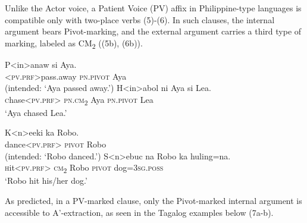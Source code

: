 \documentclass[10pt]{article}
\makeatletter
\newcommand{\boxit}{\@ifstar\@boxit\@@boxit}
\newcommand{\@@boxit}{\@boxit{1}}
\newcommand\@boxit[1]{%
\tikz[overlay,remember picture]{
\def\pointlist{}
\pgfmathsetmacro{\endpoint}{#1+1}
\foreach \x in {#1,...,\endpoint}
{\xdef\pointlist{\pointlist(\x)}}%
\node[draw,rectangle,yshift=2.6pt,semithick,
      fit=\pointlist,
      inner sep=-2.8pt,text depth=1\baselineskip] {};
}}
\makeatother
\begin{document}
Unlike the Actor voice, a Patient Voice (PV) affix in Philippine-type languages is compatible only with two-place verbs (5)-(6). In such clauses, the internal argument bears Pivot-marking, and the external argument carries a third type of marking, labeled as CM\textsubscript{2} ((5b), (6b)). 

\begin{exe}
    \begin{xlist}
    	\ex \gll *P<in>anaw si Aya. \hspace{+6.5cm}{[*1-place]}\\
            \textsc{<pv.prf>}pass.away \textsc{pn.pivot}	Aya	\\
            \trans (intended: `Aya passed away.')
	\ex \gll H<in>abol ni Aya si Lea.\hspace{+5.5cm}{[2-place]}\\
            \textsc chase\textsc{<pv.prf>} \textsc{pn.cm\textsubscript{2}}	Aya	\textsc{pn.pivot}	Lea\\
            \trans `Aya chased Lea.'
        	\end{xlist}
            \end{exe}

\begin{exe}
    \begin{xlist}
    	\ex \gll *K<n>eeki ka Robo. \hspace{+7.5cm}{[*1-place]}\\
           dance\textsc{<pv.prf>} \textsc{pivot} Robo	\\
            \trans (intended: `Robo danced.')
	\ex \gll S<n>ebuc na Robo ka huling=na. \hspace{+5.2cm}{[2-place]}\\
            \textsc hit\textsc{<pv.prf>} \textsc{cm\textsubscript{2}} Robo	\textsc{pivot} dog=\textsc{3sg.poss}\\
            \trans `Robo hit his/her dog.'
        	\end{xlist}
            \end{exe}

\noindent  As predicted, in a PV-marked clause, only the Pivot-marked internal argument is accessible to A'-extraction, as seen in the Tagalog examples below (7a-b).
\end{document}
